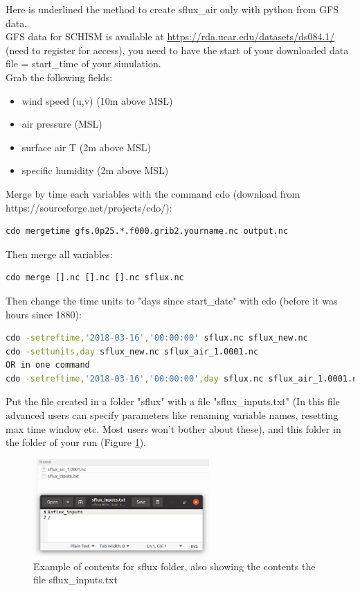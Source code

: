 \documentclass[preprints,briefreport,accept,oneauthor,pdftex]{Definitions/mdpi}
\begin{document}
\noindent Here is underlined the method to create sflux\_air only with python from GFS data.\\
GFS data for SCHISM is available at \url{https://rda.ucar.edu/datasets/ds084.1/} (need to register for access), you need to have the start of your downloaded data file = start\_time of your simulation.\\
Grab the following fields:
\begin{itemize}
    \item wind speed (u,v) (10m above MSL)
    \item air pressure (MSL)
    \item surface air T (2m above MSL)
    \item specific humidity (2m above MSL)
\end{itemize}
Merge by time each variables with the command cdo (download from https://sourceforge.net/projects/cdo/):
\begin{lstlisting}
cdo mergetime gfs.0p25.*.f000.grib2.yourname.nc output.nc
\end{lstlisting}
Then merge all variables: 
\begin{lstlisting}
cdo merge [].nc [].nc [].nc sflux.nc
\end{lstlisting}
Then change the time units to "days since start\_date" with cdo  (before it was hours since 1880):
\begin{lstlisting}[language=bash]
cdo -setreftime,'2018-03-16','00:00:00' sflux.nc sflux_new.nc 
cdo -settunits,day sflux_new.nc sflux_air_1.0001.nc 
OR in one command
cdo -setreftime,'2018-03-16','00:00:00',day sflux.nc sflux_air_1.0001.nc 
\end{lstlisting}
Put the file created in a folder "sflux" with a file "sflux\_inputs.txt" (In this file advanced users can specify parameters like renaming variable names, resetting max time window etc. Most users won't bother about these), and this folder in the folder of your run (Figure \ref{fig:sflux}).\begin{figure}[hbtp]
    \centering
    \includegraphics[width=0.6\textwidth]{figures/sflux.png}
    \caption{Example of contents for sflux folder, also showing the contents the file sflux\_inputs.txt}
    \label{fig:sflux}
\end{figure} \newline
\end{document}

